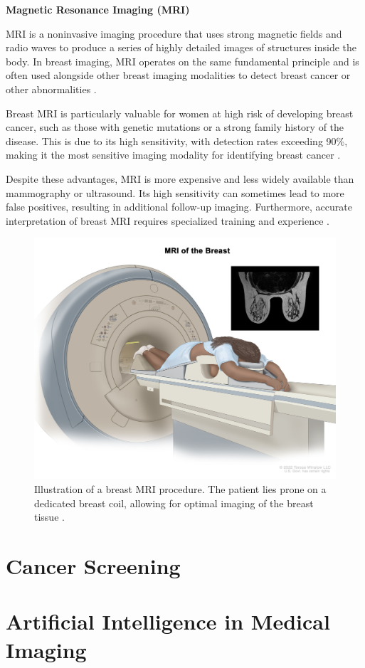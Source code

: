 \documentclass[a4paper,10pt]{book}
\begin{document}
\textbf{Magnetic Resonance Imaging (MRI)}

MRI is a noninvasive imaging procedure that uses strong magnetic fields and radio waves to produce a series of highly detailed images of structures inside the body. In breast imaging, MRI operates on the same fundamental principle and is often used alongside other breast imaging modalities to detect breast cancer or other abnormalities \cite{nih_definition_2011}. 

Breast MRI is particularly valuable for women at high risk of developing breast cancer, such as those with genetic mutations or a strong family history of the disease. This is due to its high sensitivity, with detection rates exceeding 90\%, making it the most sensitive imaging modality for identifying breast cancer \cite{radswiki_breast_nodate}.

Despite these advantages, MRI is more expensive and less widely available than mammography or ultrasound. Its high sensitivity can sometimes lead to more false positives, resulting in additional follow-up imaging. Furthermore, accurate interpretation of breast MRI requires specialized training and experience \cite{noauthor_technical_nodate}.


\begin{figure}[h!]
    \centering
    \includegraphics[width=0.5\linewidth]{reports//assets/breast_mri.jpg}
    \caption{Illustration of a breast MRI procedure. The patient lies prone on a dedicated breast coil, allowing for optimal imaging of the breast tissue \cite{nih_definition_2011}.}
    \label{fig:breast_mri}
\end{figure}



\section{Cancer Screening}




\section{Artificial Intelligence in Medical Imaging}
\end{document}
